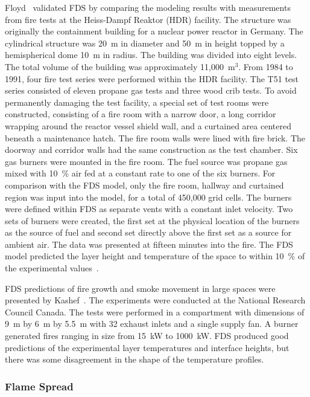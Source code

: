 Floyd~\cite{Floyd:5,Floyd:6} validated  FDS by comparing  the modeling results with  measurements from fire tests at  the Heiss-Dampf Reaktor (HDR)
facility.  The structure was originally the containment building for a nuclear power reactor  in Germany. The cylindrical structure was 20~m in
diameter and  50~m in height  topped by a  hemispherical dome 10~m  in radius.   The building  was divided  into eight  levels.  The total  volume of
the building  was approximately  11,000~m$^3$.  From 1984  to 1991, four  fire test  series were  performed within  the HDR facility.  The T51  test
series consisted of eleven  propane gas tests and three  wood crib  tests.  To avoid  permanently damaging  the test facility, a special set of  test
rooms were constructed, consisting of a fire  room with a narrow  door, a long corridor  wrapping around the reactor vessel  shield wall, and  a
curtained area centered  beneath a maintenance  hatch.   The  fire   room  walls  were  lined  with  fire brick. The doorway and corridor walls had
the same construction as the test chamber. Six gas burners were mounted in the fire room.  The fuel source was propane gas mixed with  10~\% air fed
at a constant rate to one of the  six burners.  For comparison with the  FDS model, only the fire room, hallway and curtained  region was input into
the model, for a total of 450,000 grid cells.  The burners were defined within FDS as separate vents  with a constant  inlet velocity.  Two sets  of
burners were created, the first set at the physical location of the burners as the source  of fuel and second set  directly above the first  set as a
source for  ambient air.   The data was  presented at  fifteen minutes into  the fire.
The FDS model predicted the  layer height and temperature of the space to within 10~\% of the experimental values~\cite{Floyd:5}.

FDS predictions of fire growth and smoke movement in large spaces were presented by  Kashef~\cite{Kashef:1}.  The experiments  were conducted at the
National Research Council  Canada.  The tests were performed in a compartment with  dimensions of 9~m by 6~m by  5.5~m with 32 exhaust inlets and a
single supply fan.  A burner  generated fires ranging in size  from 15~kW  to 1000~kW.   FDS produced  good predictions  of the experimental layer
temperatures and interface heights,  but there was some disagreement in the shape of the temperature profiles.


\subsubsection{Flame Spread}
\label{flame spread}

